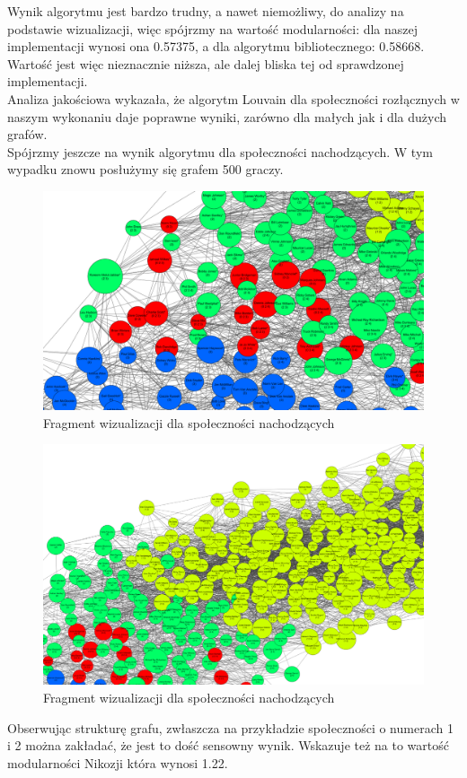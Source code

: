 \documentclass{article}
\begin{document}
Wynik algorytmu jest bardzo trudny, a nawet niemożliwy, do analizy na podstawie wizualizacji, więc spójrzmy na wartość modularności: dla naszej implementacji wynosi ona 0.57375, a dla algorytmu bibliotecznego: 0.58668. Wartość jest więc nieznacznie niższa, ale dalej bliska tej od sprawdzonej implementacji.
\\ Analiza jakościowa wykazała, że algorytm Louvain dla społeczności rozłącznych w naszym wykonaniu daje poprawne wyniki, zarówno dla małych jak i dla dużych grafów.
\\ Spójrzmy jeszcze na wynik algorytmu dla społeczności nachodzących. W tym wypadku znowu posłużymy się grafem 500 graczy.

\begin{figure}[H]
\centering
\includegraphics[width=\textwidth]{images/pw_img4.png}
\caption{Fragment wizualizacji dla społeczności nachodzących}
\end{figure}

\begin{figure}[H]
\centering
\includegraphics[width=\textwidth]{images/pw_img5.png}
\caption{Fragment wizualizacji dla społeczności nachodzących}
\end{figure}
Obserwując strukturę grafu, zwłaszcza na przykładzie społeczności o numerach 1 i 2 można zakładać, że jest to dość sensowny wynik. Wskazuje też na to wartość modularności Nikozji która wynosi 1.22.
\end{document}
